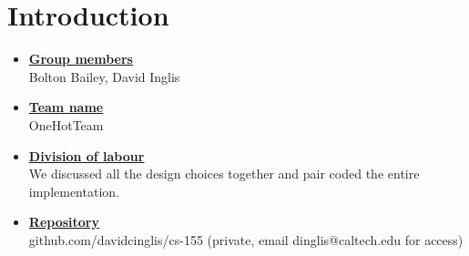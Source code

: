 \newif\ifshowsolutions
\showsolutionstrue

\newcommand{\boldline}[1]{\underline{\textbf{#1}}}



\pagestyle{fancy}






\section{Introduction}
\medskip
\begin{itemize}

    \item \boldline{Group members} \\
    Bolton Bailey, David Inglis

    \item \boldline{Team name} \\
    OneHotTeam

    \item \boldline{Division of labour} \\
    We discussed all the design choices together and pair coded the entire 
    implementation.

    \item \boldline{Repository} \\
    github.com/davidcinglis/cs-155 (private, email dinglis@caltech.edu for access)

\end{itemize}




